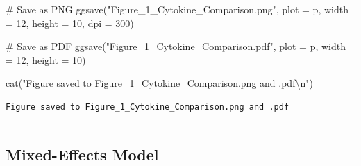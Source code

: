 \documentclass[
  letterpaper,
  DIV=11,
  numbers=noendperiod]{scrartcl}
\newenvironment{Shaded}{\begin{snugshade}}{\end{snugshade}}
\newcommand{\AttributeTok}[1]{\textcolor[rgb]{0.40,0.45,0.13}{#1}}
\newcommand{\CommentTok}[1]{\textcolor[rgb]{0.37,0.37,0.37}{#1}}
\newcommand{\DecValTok}[1]{\textcolor[rgb]{0.68,0.00,0.00}{#1}}
\newcommand{\FunctionTok}[1]{\textcolor[rgb]{0.28,0.35,0.67}{#1}}
\newcommand{\NormalTok}[1]{\textcolor[rgb]{0.00,0.23,0.31}{#1}}
\newcommand{\SpecialCharTok}[1]{\textcolor[rgb]{0.37,0.37,0.37}{#1}}
\newcommand{\StringTok}[1]{\textcolor[rgb]{0.13,0.47,0.30}{#1}}
\begin{document}
\begin{Shaded}
\begin{Highlighting}[]
\CommentTok{\# Save as PNG}
\FunctionTok{ggsave}\NormalTok{(}\StringTok{"Figure\_1\_Cytokine\_Comparison.png"}\NormalTok{, }\AttributeTok{plot =}\NormalTok{ p,}
       \AttributeTok{width =} \DecValTok{12}\NormalTok{, }\AttributeTok{height =} \DecValTok{10}\NormalTok{, }\AttributeTok{dpi =} \DecValTok{300}\NormalTok{)}

\CommentTok{\# Save as PDF}
\FunctionTok{ggsave}\NormalTok{(}\StringTok{"Figure\_1\_Cytokine\_Comparison.pdf"}\NormalTok{, }\AttributeTok{plot =}\NormalTok{ p,}
       \AttributeTok{width =} \DecValTok{12}\NormalTok{, }\AttributeTok{height =} \DecValTok{10}\NormalTok{)}

\FunctionTok{cat}\NormalTok{(}\StringTok{"Figure saved to Figure\_1\_Cytokine\_Comparison.png and .pdf}\SpecialCharTok{\textbackslash{}n}\StringTok{"}\NormalTok{)}
\end{Highlighting}
\end{Shaded}

\begin{verbatim}
Figure saved to Figure_1_Cytokine_Comparison.png and .pdf
\end{verbatim}

\begin{center}\rule{0.5\linewidth}{0.5pt}\end{center}

\subsection{Mixed-Effects Model}\label{mixed-effects-model}
\end{document}
